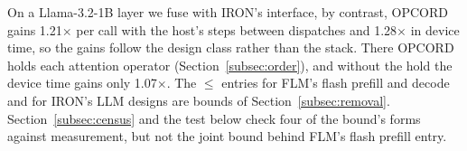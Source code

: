 On a Llama-3.2-1B layer we fuse with IRON's interface, by contrast, OPCORD gains 1.21$\times$ per call with the host's steps between dispatches and 1.28$\times$ in device time, so the gains follow the design class rather than the stack.
There OPCORD holds each attention operator (Section~\ref{subsec:order}), and without the hold the device time gains only 1.07$\times$.
The $\le$ entries for FLM's flash prefill and decode and for IRON's LLM designs are bounds of Section~\ref{subsec:removal}.
Section~\ref{subsec:census} and the test below check four of the bound's forms against measurement, but not the joint bound behind FLM's flash prefill entry.

